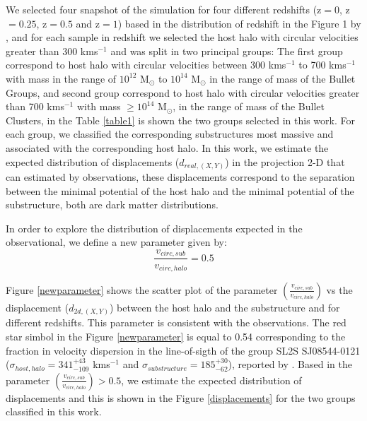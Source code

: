 \documentclass{emulateapj}
\begin{document}
We selected four snapshot of the simulation for four different
redshifts (z$=0$, z$=0.25$, z$=0.5$ and z$=1$) based in the
distribution of redshift in the Figure 1 by \citet{verdugo}, and  for
each sample in redshift we selected the host halo with circular
velocities greater than 300 kms$^{-1}$ and was split in two  principal
groups: The first group correspond to host halo with circular
velocities between 300 kms$^{-1}$ to 700 kms${^{-1}}$ with mass in the
range of $10^{12}$ M$_\odot{}$ to $10^{14}$ M$_\odot{}$ in the range
of mass of the Bullet Groups, and second group correspond to host halo
with circular velocities greater than 700 kms$^{-1}$ with mass
$\geq10^{14}$ M$_\odot{}$, in the range of mass of the Bullet
Clusters, in  the Table \ref{table1} is shown the two groups selected
in this work. For each group, we  classified the corresponding
substructures most massive and associated with the corresponding host
halo.  In  this work,
we estimate the expected distribution of displacements
($d_{real,(X,Y)}$) in the projection 2-D that can estimated by
observations, these displacements correspond to the separation between
the minimal potential of the host halo and the  minimal potential of
the substructure, both are dark matter distributions. 



In order to explore the distribution of displacements expected in the observational, we define a new parameter given by:\\

\begin{equation}
 \frac{v_{circ,sub}}{v_{circ,halo}}=0.5
\end{equation}
 

Figure \ref{newparameter} shows the scatter plot of the parameter $\left(\frac{v_{circ,sub}}{v_{circ,halo}}\right)$ vs the 
displacement ($d_{2d,(X,Y)}$) between the host halo and the substructure and for different redshifts. This parameter is 
consistent with the observations. The red star simbol in the Figure \ref{newparameter} is equal to 0.54 corresponding to 
the fraction in velocity dispersion in the line-of-sigth of the group SL2S SJ08544-0121 ($\sigma_{host,halo}=341^{+43}_{-109}$ kms$^{-1}$ and $\sigma_{substructure}=185^{+30}_{-62}$), reported by \citet{2013A&A...552A..80M}.
Based in the parameter $\left(\frac{v_{circ,sub}}{v_{circ,halo}}\right)>0.5$, we estimate the expected distribution of
displacements and this is shown in the Figure \ref{displacements} for the two groups classified in this work.
 
\end{document}
